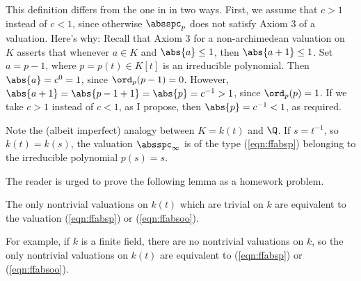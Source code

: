 This definition differs from the one in \cite[pg.~46]{cassels:global}
in two ways.  First, we assume that $c>1$ instead of $c<1$, since
otherwise $\absspc_p$ does not satisfy Axiom 3 of a valuation.  Here's
why: Recall that Axiom 3 for a non-archimedean valuation on $K$
asserts that whenever $a\in K$ and $\abs{a}\leq 1$, then
$\abs{a+1}\leq 1$.  Set $a=p-1$, where $p=p(t)\in K[t]$ is an
irreducible polynomial.  Then $\abs{a}=c^0 = 1$, since $\ord_p(p-1) =
0$.  However, $\abs{a+1} = \abs{p-1+1} = \abs{p}=c^{-1}>1$, since
$\ord_p(p) = 1$.  If we take $c>1$ instead of $c<1$, as I propose,
then $\abs{p}=c^{-1}<1$, as required.


Note the (albeit imperfect) analogy between $K=k(t)$ and $\Q$.
If $s=t^{-1}$, so $k(t)=k(s)$, the valuation $\absspc_{\infty}$
is of the type (\ref{eqn:ffabsp}) belonging to the irreducible
polynomial $p(s)=s$.

The reader is urged to prove the following lemma as a homework
problem.
\begin{lemma}
The only nontrivial valuations on $k(t)$ which are trivial
on $k$ are equivalent to the valuation (\ref{eqn:ffabsp})
or (\ref{eqn:ffabsoo}).
\end{lemma}
For example, if $k$ is a finite field, there are no
nontrivial valuations on $k$, so the only
nontrivial valuations on $k(t)$ are equivalent to 
(\ref{eqn:ffabsp}) or (\ref{eqn:ffabsoo}).




